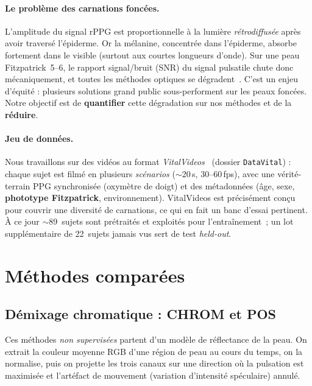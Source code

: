 \documentclass[11pt,a4paper]{article}
\begin{document}
\paragraph{Le problème des carnations foncées.}
L'amplitude du signal rPPG est proportionnelle à la lumière \emph{rétrodiffusée}
après avoir traversé l'épiderme. Or la mélanine, concentrée dans l'épiderme,
absorbe fortement dans le visible (surtout aux courtes longueurs d'onde). Sur une
peau Fitzpatrick~5--6, le rapport signal/bruit (SNR) du signal pulsatile chute
donc mécaniquement, et toutes les méthodes optiques se dégradent~\cite{nowara2020,
dasari2021}. C'est un enjeu d'équité : plusieurs solutions grand public
sous-performent sur les peaux foncées. Notre objectif est de \textbf{quantifier}
cette dégradation sur nos méthodes et de la \textbf{réduire}.

\paragraph{Jeu de données.}
Nous travaillons sur des vidéos au format \emph{VitalVideos}~\cite{toye2023}
(dossier \texttt{DataVital}) : chaque sujet est filmé en plusieurs
\emph{scénarios} ($\sim$20\,s, 30--60\,fps), avec une vérité-terrain PPG
synchronisée (oxymètre de doigt) et des métadonnées (âge, sexe, \textbf{phototype
Fitzpatrick}, environnement). VitalVideos est précisément conçu pour couvrir une
diversité de carnations, ce qui en fait un banc d'essai pertinent. À ce jour
$\sim$89~sujets sont prétraités et exploités pour l'entraînement~; un lot
supplémentaire de 22~sujets jamais vus sert de test \emph{held-out}.

\section{Méthodes comparées}

\subsection{Démixage chromatique : CHROM et POS}

Ces méthodes \emph{non supervisées} partent d'un modèle de réflectance de la peau.
On extrait la couleur moyenne RGB d'une région de peau au cours du temps, on la
normalise, puis on projette les trois canaux sur une direction où la pulsation est
maximisée et l'artéfact de mouvement (variation d'intensité spéculaire) annulé.
\end{document}
